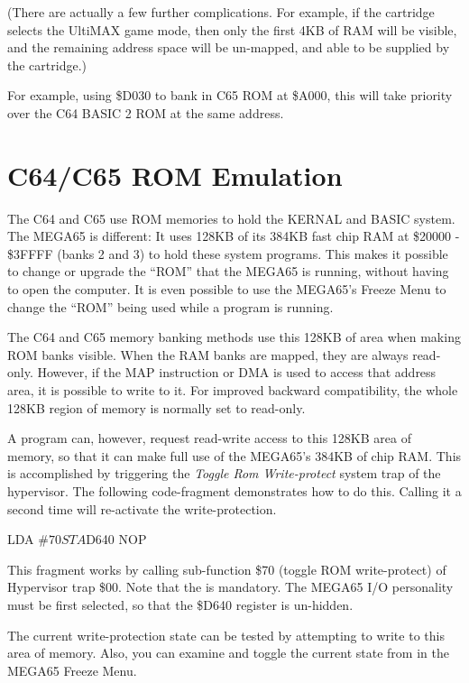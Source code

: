 (There are actually a few further complications. For example, if the
cartridge selects the UltiMAX\texttrademark{} game mode, then only the first 4KB
of RAM will be visible, and the remaining address space will be
un-mapped, and able to be supplied by the cartridge.)

For example, using \$D030 to bank in C65
ROM at \$A000, this will take priority over the C64 BASIC 2 ROM at the
same address.

\section{C64/C65 ROM Emulation}

The C64 and C65 use ROM memories to hold the KERNAL and BASIC system.
The MEGA65 is different: It uses 128KB of its 384KB fast chip RAM at
\$20000 - \$3FFFF (banks 2 and 3) to
hold these system programs. This makes it possible to change or upgrade the
``ROM'' that the MEGA65 is running, without having to open the
computer. It is even possible to use the MEGA65's Freeze Menu to
change the ``ROM'' being used while a program is running.

The C64 and C65 memory banking methods use this 128KB of area when
making ROM banks visible.  When the RAM banks are mapped, they are
always read-only.  However, if the MAP instruction or DMA is used to
access that address area, it is possible to write to it. For improved
backward compatibility, the whole 128KB region of memory is normally
set to read-only.

A program can, however, request read-write access to this
128KB area of memory, so that it can make full use of the MEGA65's
384KB of chip RAM.  This is accomplished by triggering the {\em Toggle
  Rom Write-protect} system trap of the hypervisor.  The following
code-fragment demonstrates how to do this. Calling it a second time
will re-activate the write-protection.

\begin{screenoutput}
  LDA #$70
  STA $D640
  NOP
\end{screenoutput}

This fragment works by
calling sub-function \$70 (toggle ROM write-protect) of Hypervisor
trap \$00. Note that the  is mandatory. The MEGA65
I/O personality must be first selected, so that the \$D640 register is
un-hidden.

The current write-protection
state can be tested by attempting to write to this area of memory.
Also, you can examine and toggle the current state from in the MEGA65
Freeze Menu.

